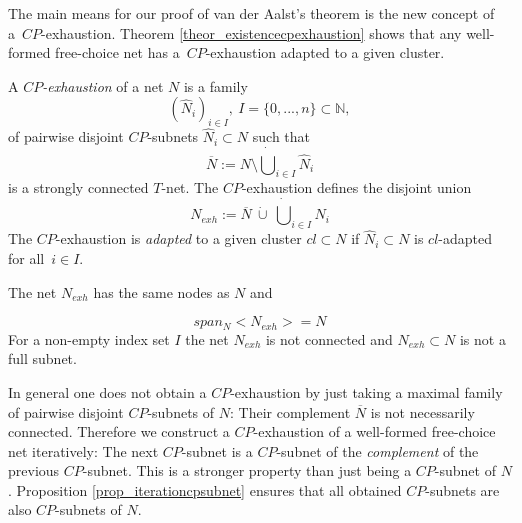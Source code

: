 \documentclass{fundam}
\begin{document}
\begin{flushleft}
The main means for our proof of van der Aalst's theorem is the new concept of \mbox{a $CP$-exhaustion}. Theorem \ref{theor_existencecpexhaustion} shows that any well-formed free-choice net has \mbox{a $CP$-exhaustion} adapted to a given cluster.
\end{flushleft}
\begin{definition}\label{def_cpexhaustion}
A \emph{$CP$-exhaustion} of a net $N$ is a family
$${(\hat{N}_i)}_{i \in I},\ I=\{0,...,n\} \subset \mathbb{N},$$
of pairwise disjoint $CP$-subnets $\hat{N}_i \subset N$ such that
$$\overline{N}:=N \setminus \dot\bigcup_{i\in I} \hat{N}_i$$
is a strongly connected $T$-net. The $CP$-exhaustion defines the disjoint union
$$N_{exh}:=\overline{N} \  \dot\cup \  \dot\bigcup_{i\in I} \hat{N}_i$$
The $CP$-exhaustion is \emph{adapted} to a given cluster $cl \subset N$ if $\hat{N}_i \subset N$ is $cl$-adapted for \mbox{all $i\in I$}.
\end{definition}

\begin{flushleft}
The net $N_{exh}$ has the same nodes as $N$ and
\end{flushleft}
$$span_N<N_{exh}>=N$$
For a non-empty index set $I$ the net $N_{exh}$ is not connected and $N_{exh} \subset N$ is not a full subnet.

\eject
\medskip\noindent
In general one does not obtain a $CP$-exhaustion by just taking a maximal family of pairwise disjoint $CP$-subnets of $N$:
Their complement $\overline{N}$ is not necessarily connected. Therefore we construct a $CP$-exhaustion of a well-formed free-choice net iteratively: The next $CP$-subnet is a $CP$-subnet of the \emph{complement} of the previous $CP$-subnet. This is a stronger property than just being a $CP$-subnet
of $N$. Proposition \ref{prop_iterationcpsubnet} ensures that all obtained $CP$-subnets are also $CP$-subnets of $N$.
\end{document}
